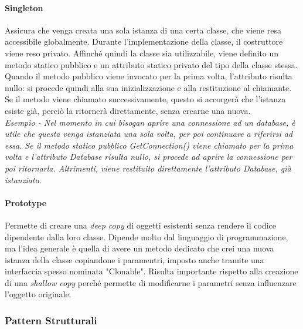 \documentclass{article}
\begin{document}
            \paragraph{Singleton} Assicura che venga creata una sola istanza di una certa classe, che viene resa accessibile globalmente.
                Durante l'implementazione della classe, il costruttore viene reso privato.
                Affinché quindi la classe sia utilizzabile, viene definito un metodo statico pubblico e un attributo statico privato del tipo della classe stessa.
                Quando il metodo pubblico viene invocato per la prima volta, l'attributo risulta nullo: si procede quindi alla sua inizializzazione e alla restituzione al chiamante.
                Se il metodo viene chiamato successivamente, questo si accorgerà che l'istanza esiste già, perciò la ritornerà direttamente, senza crearne una nuova.\\
                \textit{Esempio - Nel momento in cui bisogan aprire una connessione ad un database, è utile che questa venga istanziata una sola volta, per poi continuare a riferirsi ad essa.
                    Se il metodo statico pubblico GetConnection() viene chiamato per la prima volta e l'attributo Database risulta nullo, si procede ad aprire la connessione per poi ritornarla.
                    Altrimenti, viene restituito direttamente l'attributo Database, già istanziato.
                }  
            \paragraph{Prototype} Permette di creare una \textit{deep copy} di oggetti esistenti senza rendere il codice dipendente dalla loro classe.
                Dipende molto dal linguaggio di programmazione, ma l'idea generale è quella di avere un metodo dedicato che crei una nuova istanza della classe copiandone i paramentri, imposto anche tramite una interfaccia spesso nominata "Clonable".
                Risulta importante rispetto alla creazione di una \textit{shallow copy} perché permette di modificarne i parametri senza influenzare l'oggetto originale. 
        
        \subsubsection{Pattern Strutturali}
\end{document}
